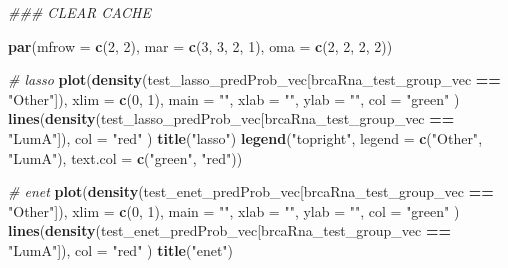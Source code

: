 \documentclass[
]{book}
\newenvironment{Shaded}{\begin{snugshade}}{\end{snugshade}}
\newcommand{\CommentTok}[1]{\textcolor[rgb]{0.56,0.35,0.01}{\textit{#1}}}
\newcommand{\DataTypeTok}[1]{\textcolor[rgb]{0.13,0.29,0.53}{#1}}
\newcommand{\DecValTok}[1]{\textcolor[rgb]{0.00,0.00,0.81}{#1}}
\newcommand{\KeywordTok}[1]{\textcolor[rgb]{0.13,0.29,0.53}{\textbf{#1}}}
\newcommand{\NormalTok}[1]{#1}
\newcommand{\OperatorTok}[1]{\textcolor[rgb]{0.81,0.36,0.00}{\textbf{#1}}}
\newcommand{\StringTok}[1]{\textcolor[rgb]{0.31,0.60,0.02}{#1}}
\begin{document}
\begin{Shaded}
\begin{Highlighting}[]
\CommentTok{\#\#\# CLEAR CACHE}

\KeywordTok{par}\NormalTok{(}\DataTypeTok{mfrow =} \KeywordTok{c}\NormalTok{(}\DecValTok{2}\NormalTok{, }\DecValTok{2}\NormalTok{), }\DataTypeTok{mar =} \KeywordTok{c}\NormalTok{(}\DecValTok{3}\NormalTok{, }\DecValTok{3}\NormalTok{, }\DecValTok{2}\NormalTok{, }\DecValTok{1}\NormalTok{), }\DataTypeTok{oma =} \KeywordTok{c}\NormalTok{(}\DecValTok{2}\NormalTok{, }\DecValTok{2}\NormalTok{, }\DecValTok{2}\NormalTok{, }\DecValTok{2}\NormalTok{))}

\CommentTok{\# lasso}
\KeywordTok{plot}\NormalTok{(}\KeywordTok{density}\NormalTok{(test\_lasso\_predProb\_vec[brcaRna\_test\_group\_vec }\OperatorTok{==}\StringTok{ "Other"}\NormalTok{]),}
  \DataTypeTok{xlim =} \KeywordTok{c}\NormalTok{(}\DecValTok{0}\NormalTok{, }\DecValTok{1}\NormalTok{), }\DataTypeTok{main =} \StringTok{""}\NormalTok{, }\DataTypeTok{xlab =} \StringTok{""}\NormalTok{, }\DataTypeTok{ylab =} \StringTok{""}\NormalTok{, }\DataTypeTok{col =} \StringTok{"green"}
\NormalTok{)}
\KeywordTok{lines}\NormalTok{(}\KeywordTok{density}\NormalTok{(test\_lasso\_predProb\_vec[brcaRna\_test\_group\_vec }\OperatorTok{==}\StringTok{ "LumA"}\NormalTok{]),}
  \DataTypeTok{col =} \StringTok{"red"}
\NormalTok{)}
\KeywordTok{title}\NormalTok{(}\StringTok{"lasso"}\NormalTok{)}
\KeywordTok{legend}\NormalTok{(}\StringTok{"topright"}\NormalTok{, }\DataTypeTok{legend =} \KeywordTok{c}\NormalTok{(}\StringTok{"Other"}\NormalTok{, }\StringTok{"LumA"}\NormalTok{), }\DataTypeTok{text.col =} \KeywordTok{c}\NormalTok{(}\StringTok{"green"}\NormalTok{, }\StringTok{"red"}\NormalTok{))}

\CommentTok{\# enet}
\KeywordTok{plot}\NormalTok{(}\KeywordTok{density}\NormalTok{(test\_enet\_predProb\_vec[brcaRna\_test\_group\_vec }\OperatorTok{==}\StringTok{ "Other"}\NormalTok{]),}
  \DataTypeTok{xlim =} \KeywordTok{c}\NormalTok{(}\DecValTok{0}\NormalTok{, }\DecValTok{1}\NormalTok{), }\DataTypeTok{main =} \StringTok{""}\NormalTok{, }\DataTypeTok{xlab =} \StringTok{""}\NormalTok{, }\DataTypeTok{ylab =} \StringTok{""}\NormalTok{, }\DataTypeTok{col =} \StringTok{"green"}
\NormalTok{)}
\KeywordTok{lines}\NormalTok{(}\KeywordTok{density}\NormalTok{(test\_enet\_predProb\_vec[brcaRna\_test\_group\_vec }\OperatorTok{==}\StringTok{ "LumA"}\NormalTok{]),}
  \DataTypeTok{col =} \StringTok{"red"}
\NormalTok{)}
\KeywordTok{title}\NormalTok{(}\StringTok{"enet"}\NormalTok{)}


\end{Highlighting}
\end{Shaded}
\end{document}
